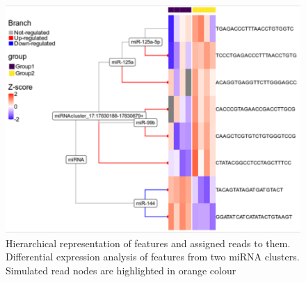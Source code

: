 \documentclass[12pt,twoside]{reedthesis}
\begin{document}
\begin{figure}[h]

{\centering \includegraphics{thesis_files/figure-latex/3f16-1} 

}

\caption{Hierarchical representation of features and assigned reads to them. Differential expression analysis of features from two miRNA clusters. Simulated read nodes are highlighted in orange colour}\label{fig:3f16}
\end{figure}
\end{document}
